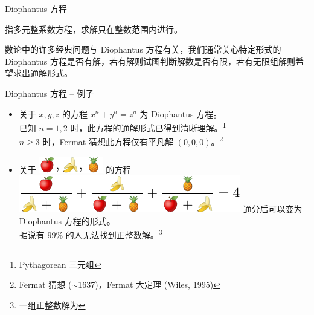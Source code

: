 \documentclass{../pkslide}
\begin{document}

\begin{frame}{Diophantus 方程}
  \begin{definition}
    指多元整系数方程，求解只在整数范围内进行。
  \end{definition}
  
  数论中的许多经典问题与 Diophantus 方程有关，我们通常关心特定形式的 Diophantus 方程是否有解，若有解则试图判断解数是否有限，若有无限组解则希望求出通解形式。
\end{frame}

\begin{frame}{Diophantus 方程 -- 例子}
  \begin{examples}[Diophantus 方程]
    \begin{itemize}
      \item<2-> 关于 $x, y, z$ 的方程 $x^n + y^n = z^n$ 为 Diophantus 方程。\\
        已知 $n = 1, 2$ 时，此方程的通解形式已得到清晰理解。\footnote<2->{Pythagorean 三元组}\\
        \-\hspace{2em} $n \ge 3$ 时，Fermat 猜想此方程仅有平凡解 $(0, 0, 0)$。\footnote<2->{Fermat 猜想 ($\sim$1637)，Fermat 大定理 (Wiles, 1995)}
      \item<3-> 关于 \includegraphics[align = c]{pics/fruits.pdf} 的方程 \includegraphics[align = c]{pics/fruits_equation.pdf} 通分后可以变为 Diophantus 方程的形式。\\
        据说有 $99 \%$ 的人无法找到正整数解。\footnote<3->{一组正整数解为}
    \end{itemize}
  \end{examples}
  
\end{frame}
\end{document}
